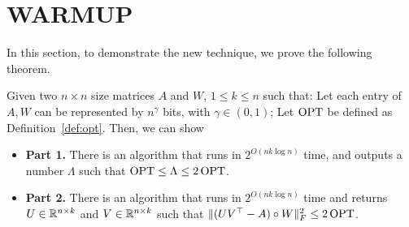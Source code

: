 \section{WARMUP}\label{sec:additive}
 

In this section, to demonstrate the new technique, we prove the following theorem.

\begin{lemma}\label{lem:warmup}
Given two $n \times n$ size matrices $A$ and $W$, $1 \leq k \leq n$  such that: Let each entry of $A,W$ can be represented by $n^{\gamma}$ bits, with $\gamma \in (0,1)$; Let $\operatorname{OPT}$ be defined as Definition~\ref{def:opt}.  
Then, we can show
\begin{itemize}
\item {\bf Part 1.} There is an algorithm that runs in $2^{O(nk\log n)}$ time, and outputs a number $\Lambda$  such that $\operatorname{OPT} \leq \Lambda \leq 2 \operatorname{OPT} $. 
\item {\bf Part 2.} There is an algorithm that runs in $2^{O(n k \log n)}$ time and returns $U \in \mathbb{R}^{n \times k}$ and $V \in \mathbb{R}^{n \times k}$ such that $\| (UV^\top - A) \circ W \|_F^2 \leq 2 \operatorname{OPT}$.
\end{itemize}
\end{lemma}



